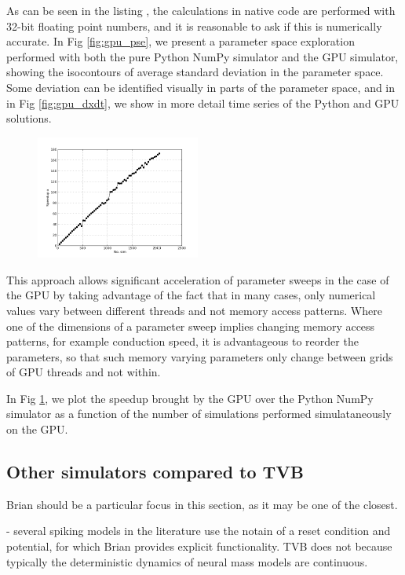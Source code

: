 


	As can be seen in the listing , the calculations
	in native code are performed with 32-bit floating point numbers, and it
	is reasonable to ask if this is numerically accurate. In Fig 
	\ref{fig:gpu_pse}, we present a parameter space exploration performed with
	both the pure Python NumPy simulator and the GPU simulator, showing the 
	isocontours of average standard deviation in the parameter space. Some
	deviation can be identified visually in parts of the parameter space, and
	in in Fig \ref{fig:gpu_dxdt}, we show in more detail time series of 
	the Python and GPU solutions.

	 \begin{figure}
		{\includegraphics[width=0.48\textwidth]{images/gpu_acceleration.png}}
		\caption{}
		\label{fig:gpu_acceleration}
	\end{figure}

	This approach allows significant acceleration of parameter sweeps in the
	case of the GPU by taking
	advantage of the fact that in many cases, only numerical values vary
	between different threads and not memory access patterns. Where one of the
	dimensions of a parameter sweep implies changing memory access patterns, 
	for example conduction speed, it is advantageous to reorder the parameters,
	so that such memory varying parameters only change between grids of GPU
	threads and not within.

	In Fig \ref{fig:gpu_acceleration}, we plot the speedup brought by the GPU
	over the Python NumPy simulator as a function of the number of simulations 
	performed simulataneously on the GPU.


\subsection{Other simulators compared to TVB}

	Brian should be a particular focus in this section, as it may
	be one of the closest. 

	- several spiking models in the literature use the notain of a reset
		condition and potential, for which Brian provides explicit
		functionality. TVB does not because typically the deterministic
		dynamics of neural mass models are continuous.
